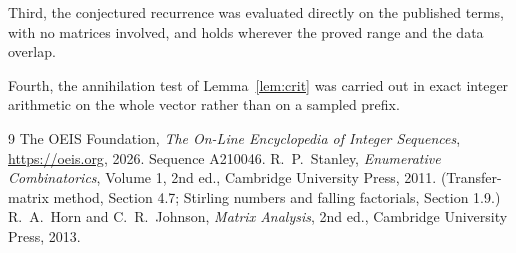 \documentclass[11pt,a4paper]{article}
\theoremstyle{plain}
\theoremstyle{definition}
\begin{document}
Third, the conjectured recurrence was evaluated directly on the published terms, with no
matrices involved, and holds wherever the proved range and the data overlap.

Fourth, the annihilation test of Lemma~\ref{lem:crit} was carried out in exact integer
arithmetic on the whole vector rather than on a sampled prefix.

\begin{thebibliography}{9}
 The OEIS Foundation, \emph{The On-Line Encyclopedia of Integer
Sequences}, \url{https://oeis.org}, 2026. Sequence A210046.
 R.~P.~Stanley, \emph{Enumerative Combinatorics}, Volume 1, 2nd ed.,
Cambridge University Press, 2011. (Transfer-matrix method, Section 4.7; Stirling numbers and
falling factorials, Section 1.9.)
 R.~A.~Horn and C.~R.~Johnson, \emph{Matrix Analysis}, 2nd ed., Cambridge
University Press, 2013.
\end{thebibliography}
\end{document}
